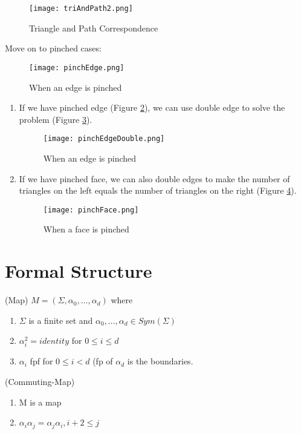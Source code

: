 \documentclass[12pt]{article}
\newcommand{\fref}[1]{Figure \ref{#1}}
\begin{document}
\begin{figure}[h!]
  \centering
  \texttt{[image: triAndPath2.png]}
  \caption{Triangle and Path Correspondence}
  \label{fig:triAndPath2}
\end{figure}

Move on to pinched cases: 
\begin{figure}[h!]
  \centering
  \texttt{[image: pinchEdge.png]}
  \caption{When an edge is pinched}
  \label{fig:pinchEdge}
\end{figure}
\begin{enumerate}[1)]
\item If we have pinched edge (\fref{fig:pinchEdge}), we can use
  double edge to solve the problem (\fref{fig:pinchEdgeDouble}).
\begin{figure}[h!]
  \centering
  \texttt{[image: pinchEdgeDouble.png]}
  \caption{When an edge is pinched}
  \label{fig:pinchEdgeDouble}
\end{figure}
\item If we have pinched face, we can also double edges to make the
  number of triangles on the left equals the number of triangles on
  the right (\fref{fig:pinchFace}).
\begin{figure}[h!]
  \centering
  \texttt{[image: pinchFace.png]}
  \caption{When a face is pinched}
  \label{fig:pinchFace}
\end{figure}
\end{enumerate}
\section{Formal Structure}
\begin{definition}(Map) $M = (\Sigma, \alpha_0, \dots, \alpha_d)$
  where
  \begin{enumerate}[1)]
  \item $\Sigma$ is a finite set and
    $\alpha_0, \dots, \alpha_d \in Sym(\Sigma)$
  \item $\alpha_i^2 = identity$ for $0 \leq i \leq d$
  \item $\alpha_i$ fpf for $0 \leq i < d$ (fp of $\alpha_d$ is the boundaries.
  \end{enumerate}
\end{definition}

\begin{definition}(Commuting-Map)
  \begin{enumerate}[1)]
  \item M is a map
  \item $\alpha_i\alpha_j = \alpha_j\alpha_i, i + 2 \leq j$
  \end{enumerate}
\end{definition}
\end{document}
